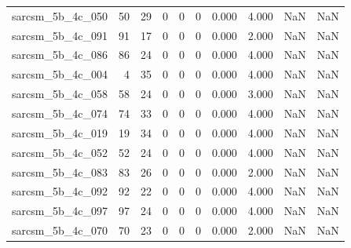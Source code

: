 \documentclass{article}
\begin{document}
\begin{longtable}{lrrrrrrrrr}
sarcsm\_5b\_4c\_050 & 50 & 29 & 0 & 0 & 0 & 0.000 & 4.000 & NaN & NaN \\
sarcsm\_5b\_4c\_091 & 91 & 17 & 0 & 0 & 0 & 0.000 & 2.000 & NaN & NaN \\
sarcsm\_5b\_4c\_086 & 86 & 24 & 0 & 0 & 0 & 0.000 & 4.000 & NaN & NaN \\
sarcsm\_5b\_4c\_004 & 4 & 35 & 0 & 0 & 0 & 0.000 & 4.000 & NaN & NaN \\
sarcsm\_5b\_4c\_058 & 58 & 24 & 0 & 0 & 0 & 0.000 & 3.000 & NaN & NaN \\
sarcsm\_5b\_4c\_074 & 74 & 33 & 0 & 0 & 0 & 0.000 & 4.000 & NaN & NaN \\
sarcsm\_5b\_4c\_019 & 19 & 34 & 0 & 0 & 0 & 0.000 & 4.000 & NaN & NaN \\
sarcsm\_5b\_4c\_052 & 52 & 24 & 0 & 0 & 0 & 0.000 & 4.000 & NaN & NaN \\
sarcsm\_5b\_4c\_083 & 83 & 26 & 0 & 0 & 0 & 0.000 & 2.000 & NaN & NaN \\
sarcsm\_5b\_4c\_092 & 92 & 22 & 0 & 0 & 0 & 0.000 & 4.000 & NaN & NaN \\
sarcsm\_5b\_4c\_097 & 97 & 24 & 0 & 0 & 0 & 0.000 & 4.000 & NaN & NaN \\
sarcsm\_5b\_4c\_070 & 70 & 23 & 0 & 0 & 0 & 0.000 & 2.000 & NaN & NaN \\
\end{longtable}
\end{document}
